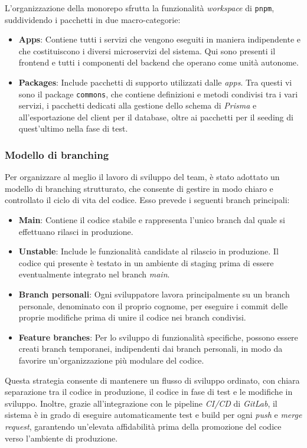L'organizzazione della monorepo sfrutta la funzionalità \textit{workspace} di \texttt{pnpm}, suddividendo i pacchetti in due macro-categorie:
\begin{itemize}
  \item \textbf{Apps}: Contiene tutti i servizi che vengono eseguiti in maniera indipendente e che costituiscono i diversi microservizi del sistema. Qui sono presenti il frontend e tutti i componenti del backend che operano come unità autonome.
  \item \textbf{Packages}: Include pacchetti di supporto utilizzati dalle \textit{apps}. Tra questi vi sono il package \texttt{commons}, che contiene definizioni e metodi condivisi tra i vari servizi, i pacchetti dedicati alla gestione dello schema di \textit{Prisma} e all'esportazione del client per il database, oltre ai pacchetti per il seeding di quest'ultimo nella fase di test.
\end{itemize}

\subsubsection{Modello di branching}
Per organizzare al meglio il lavoro di sviluppo del team, è stato adottato un modello di branching strutturato, che consente di gestire in modo chiaro e controllato il ciclo di vita del codice. Esso prevede i seguenti branch principali:
\begin{itemize}
  \item \textbf{Main}: Contiene il codice stabile e rappresenta l'unico branch dal quale si effettuano rilasci in produzione.
  \item \textbf{Unstable}: Include le funzionalità candidate al rilascio in produzione. Il codice qui presente è testato in un ambiente di staging prima di essere eventualmente integrato nel branch \textit{main}.
  \item \textbf{Branch personali}: Ogni sviluppatore lavora principalmente su un branch personale, denominato con il proprio cognome, per eseguire i commit delle proprie modifiche prima di unire il codice nei branch condivisi.
  \item \textbf{Feature branches}: Per lo sviluppo di funzionalità specifiche, possono essere creati branch temporanei, indipendenti dai branch personali, in modo da favorire un'organizzazione più modulare del codice.
\end{itemize}

Questa strategia consente di mantenere un flusso di sviluppo ordinato, con chiara separazione tra il codice in produzione, il codice in fase di test e le modifiche in sviluppo. Inoltre, grazie all'integrazione con le pipeline \textit{CI/CD} di \textit{GitLab}, il sistema è in grado di eseguire automaticamente test e build per ogni \textit{push} e \textit{merge request}, garantendo un'elevata affidabilità prima della promozione del codice verso l'ambiente di produzione.


